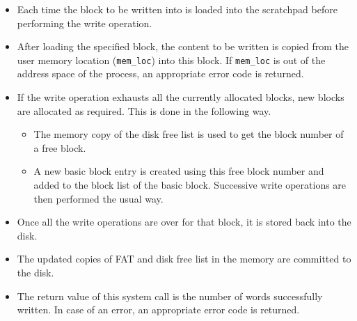 \begin{itemize}
	\item Each time the block to be written into is loaded into the scratchpad before performing the write operation.
	
	\item After loading the specified block, the content to be written is copied from the user memory location (\texttt{mem\_loc}) into this block. If \texttt{mem\_loc} is out of the address space of the process, an appropriate error code is returned.
	
	\item If the write operation exhausts all the currently allocated blocks, new blocks are allocated as required. This is done in the following way.
	\begin{itemize}
		\item The memory copy of the disk free list  is used to get the block number of a free block.
		\item A new basic block entry is created using this free block number and added to the block list of the basic block. Successive write operations are then performed the usual way.
	\end{itemize}
	
	\item Once all the write operations are over for that block, it is stored back into the disk.
	
	\item The updated copies of FAT  and disk free list 
	 in the memory are committed to the disk.
	
	\item The return value of this system call is the number of words successfully written. In case of an error, an appropriate error code is returned.
\end{itemize}
